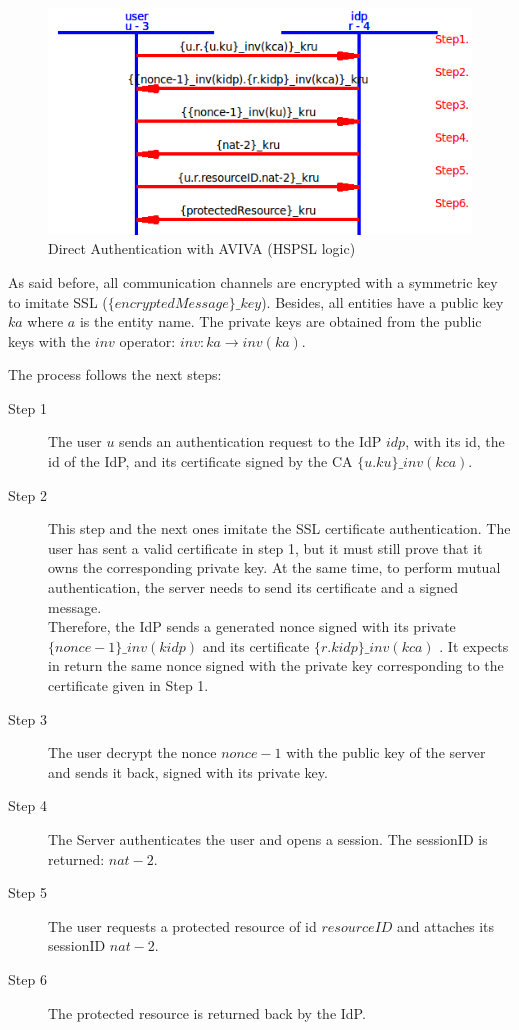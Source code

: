 \begin{figure}[!htbp]
	\centering
	\caption{Direct Authentication with AVIVA (HSPSL logic)}
	\label{fig:AVIVA_direct_auth}
	\includegraphics[width=1\textwidth]{images/prot_eva_2.png}
\end{figure}

As said before, all communication channels are encrypted with a symmetric key to imitate SSL ($\{encryptedMessage\}\_key$). Besides, all entities have a public key $ka$ where $a$ is the entity name. The private keys are obtained from the public keys with the $inv$ operator: $inv : ka \rightarrow inv(ka)$.

The process follows the next steps:
\begin{description}
	\item[Step 1] The user $ u $ sends an authentication request to the IdP $ idp $, with its id, the id of the IdP, and its certificate signed by the CA $ \{u.ku\}\_inv(kca) $.
	\item[Step 2] This step and the next ones imitate the SSL certificate authentication. The user has sent a valid certificate in step 1, but it must still prove that it owns the corresponding private key. At the same time, to perform mutual authentication, the server needs to send its certificate and a signed message.
	 \\ Therefore, the IdP sends a generated nonce signed with its private $ \{nonce-1\}\_inv(kidp) $ and its certificate $ \{r.kidp\}\_inv(kca) $ . It expects in return the same nonce signed with the private key corresponding to the certificate given in Step 1.
	\item[Step 3] The user decrypt the nonce $ nonce-1 $ with the public key of the server and sends it back, signed with its private key.
	\item[Step 4] The Server authenticates the user and opens a session. The sessionID is returned: $ nat-2 $.
	\item[Step 5] The user requests a protected resource of id $ resourceID $ and attaches its sessionID $ nat-2 $.  
	\item[Step 6] The protected resource is returned back by the IdP.
\end{description}

